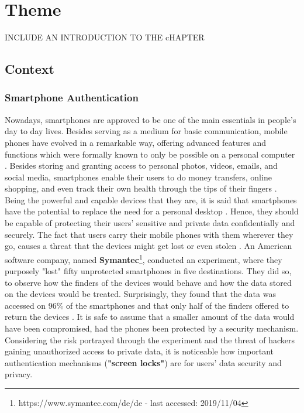 
\chapter{Theme}\label{ch:second}

INCLUDE AN INTRODUCTION TO THE cHAPTER

\section{Context}

\subsection{Smartphone Authentication}

Nowadays, smartphones are approved to be one of the main essentials in people's day to day lives. Besides serving as a medium for basic communication, mobile phones have evolved in a remarkable way, offering advanced features and functions which were formally known to only be possible on a personal computer \cite{Alsaleh}. Besides storing and granting access to personal photos, videos, emails, and social media, smartphones enable their users to do money transfers, online shopping, and even track their own health through the tips of their fingers \cite{Egelman:2014:YRL:2660267.2660273,Albayram:2017:BUL:3235924.3235929,Schloeglhofer}. \\

Being the powerful and capable devices that they are, it is said that smartphones have the potential to replace the need for a personal desktop \cite{Alsaleh}. Hence, they should be capable of protecting their users' sensitive and private data confidentially and securely. The fact that users carry their mobile phones with them wherever they go, causes a threat that the devices might get  lost or even stolen \cite{Egelman:2014:YRL:2660267.2660273}. An American software company, named \textbf{Symantec}\footnote{https://www.symantec.com/de/de - last accessed: 2019/11/04}, conducted an experiment, where they purposely "lost" fifty unprotected smartphones in five destinations. They did so, to observe how the finders of the devices would behave and how the data stored on the devices would be treated. Surprisingly, they found that the data was accessed on 96\% of the smartphones and that only half of the finders offered to return the devices \cite{symantec}. It is safe to assume that a smaller amount of the data would have been compromised, had the phones been protected by a security mechanism. Considering the risk portrayed through the experiment and the threat of hackers gaining unauthorized access to private data, it is noticeable how important authentication mechanisms (\textbf{"screen locks"}) are for users' data security and privacy.\\

